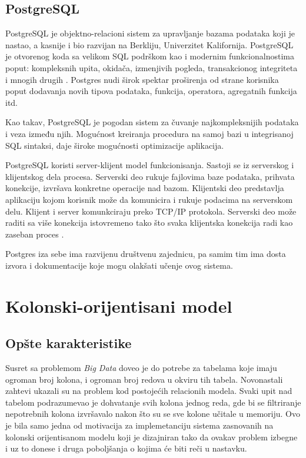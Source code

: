 \documentclass[12pt,oneside]{memoir}
\begin{document}
\subsection{PostgreSQL}


PostgreSQL je objektno-relacioni sistem za upravljanje bazama podataka koji je nastao, a kasnije i bio razvijan na Berkliju, Univerzitet Kalifornija. PostgreSQL je otvorenog koda sa velikom SQL podrškom kao i modernim funkcionalnostima poput: kompleksnih upita, okidača, izmenjivih pogleda, transakcionog integriteta i mnogih drugih \cite{PostgresHistory}. Postgres nudi širok spektar proširenja od strane korisnika poput dodavanja novih tipova podataka, funkcija, operatora, agregatnih funkcija itd. 

Kao takav, PostgreSQL je pogodan sistem za čuvanje najkompleksnijih podataka i veza između njih. Mogućnost kreiranja procedura na samoj bazi u integrisanoj SQL sintaksi, daje široke mogućnosti optimizacije aplikacija. 

PostgreSQL koristi server-klijent model funkcionisanja. Sastoji se iz serverskog i klijentskog dela procesa. Serverski deo rukuje fajlovima baze podataka, prihvata konekcije, izvršava konkretne operacije nad bazom. Klijentski deo predstavlja aplikaciju kojom korisnik može da komunicira i rukuje podacima na serverskom delu. Klijent i server komunkciraju preko TCP/IP protokola. Serverski deo može raditi sa više konekcija istovremeno tako što svaka klijentska konekcija radi kao zaseban proces \cite{PostgreSQLUpAndRunning}.

Postgres iza sebe ima razvijenu društvenu zajednicu, pa samim tim ima dosta izvora i dokumentacije koje mogu olakšati učenje ovog sistema. 

\section{Kolonski-orijentisani model}
\subsection{Opšte karakteristike}

Susret sa problemom \textit{Big Data} doveo je do potrebe za tabelama koje imaju ogroman broj kolona, i ogroman broj redova u okviru tih tabela. Novonastali zahtevi ukazali su na problem kod postojećih  relacionih modela. Svaki upit nad tabelom podrazumevao je dohvatanje svih kolona jednog reda, gde bi se filtriranje nepotrebnih kolona izvršavalo nakon što su se sve kolone učitale u memoriju. Ovo je bila samo jedna od motivacija za implemetanciju sistema zasnovanih na kolonski orijentisanom modelu koji je dizajniran tako da ovakav problem izbegne i uz to donese i druga poboljšanja o kojima će biti reči u nastavku.
\end{document}
